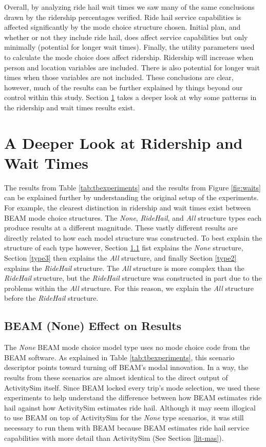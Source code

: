 \documentclass[fancy, masters]{byuthesis}
\begin{document}
Overall, by analyzing ride hail wait times we saw many of the same conclusions drawn by the ridership percentages verified. Ride hail service capabilities is affected significantly by the mode choice structure chosen. Initial plan, and whether or not they include ride hail, does affect service capabilities but only minimally (potential for longer wait times). Finally, the utility parameters used to calculate the mode choice does affect ridership. Ridership will increase when person and location variables are included. There is also potential for longer wait times when those variables are not included. These conclusions are clear, however, much of the results can be further explained by things beyond our control within this study. Section \ref{deep-look} takes a deeper look at why some patterns in the ridership and wait times results exist.

\hypertarget{deep-look}{%
\section{A Deeper Look at Ridership and Wait Times}\label{deep-look}}

The results from Table \ref{tab:tbexperiments} and the results from Figure \ref{fig:waits} can be explained further by understanding the original setup of the experiments. For example, the clearest distinction in ridership and wait times exist between BEAM mode choice structures. The \emph{None}, \emph{RideHail}, and \emph{All} structure types each produce results at a different magnitude. These vastly different results are directly related to how each model structure was constructed. To best explain the structure of each type however, Section \ref{type1} fist explains the \emph{None} structure, Section \ref{type3} then explains the \emph{All} structure, and finally Section \ref{type2} explains the \emph{RideHail} structure. The \emph{All} structure is more complex than the \emph{RideHail} structure, but the \emph{RideHail} structure was constructed in part due to the problems within the \emph{All} structure. For this reason, we explain the \emph{All} structure before the \emph{RideHail} structure.

\hypertarget{type1}{%
\subsection{BEAM (None) Effect on Results}\label{type1}}

The \emph{None} BEAM mode choice model type uses no mode choice code from the BEAM software. As explained in Table \ref{tab:tbexperiments}, this scenario descriptor points toward turning off BEAM's modal innovation. In a way, the results from these scenarios are almost identical to the direct output of ActivitySim itself. Since BEAM locked every trip's mode selection, we used these experiments to help understand the difference between how BEAM estimates ride hail against how ActivitySim estimates ride hail. Although it may seem illogical to use BEAM on top of ActivitySim for the \emph{None} type scenarios, it was still necessary to run them with BEAM because BEAM estimates ride hail service capabilities with more detail than ActivitySim (See Section \ref{lit-mas}).
\end{document}
